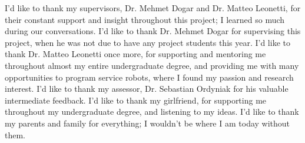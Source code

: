 I'd like to thank my supervisors, Dr. Mehmet Dogar and Dr. Matteo Leonetti, for their constant support and insight throughout this project; I learned so much during our conversations. I'd like to thank Dr. Mehmet Dogar for supervising this project, when he was not due to have any project students this year. I'd like to thank Dr. Matteo Leonetti once more, for supporting and mentoring me throughout almost my entire undergraduate degree, and providing me with many opportunities to program service robots, where I found my passion and research interest. I'd like to thank my assessor, Dr. Sebastian Ordyniak for his valuable intermediate feedback. I'd like to thank my girlfriend, for supporting me throughout my undergraduate degree, and listening to my ideas. I'd like to thank my parents and family for everything; I wouldn't be where I am today without them.